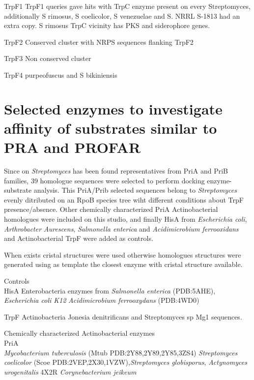 \documentclass[12pt,twoside]{reedthesis}
\begin{document}
  TrpF1 TrpF1 queries gave hits with TrpC enzyme present on every
  Streptomyces, additionally S rimosus, S coelicolor, S venezuelae and S.
  NRRL S-1813 had an extra copy. S rimosus TrpC vicinity has PKS and
  siderophore genes.
  
  TrpF2 Conserved cluster with NRPS sequences flanking TrpF2
  
  TrpF3 Non conserved cluster
  
  TrpF4 purpeofuscus and S bikiniensis \clearpage  
  
  \section{Selected enzymes to investigate affinity of substrates similar
  to PRA and
  PROFAR}\label{selected-enzymes-to-investigate-affinity-of-substrates-similar-to-pra-and-profar}
  
  Since on \emph{Streptomyces} has been found representatives from PriA
  and PriB families, 39 homologue sequences were selected to perform
  docking enzyme-substrate analysis. This PriA/Prib selected sequences
  belong to \emph{Streptomyces} evenly ditributed on an RpoB species tree
  wiht different conditions about TrpF presence/absence. Other chemically
  characterized PriA Actinobacterial homologues were included on this
  studio, and finally HisA from \emph{Escherichia coli},
  \emph{Arthrobacter Aurescens}, \emph{Salmonella enterica} and
  \emph{Acidimicrobium ferrooxidans} and Actinobacterial TrpF were added
  as controls.
  
  When exists cristal structures were used otherwise homologues structures
  were generated using as template the closest enzyme with cristal
  structure available.
  
  Controls\\
  HisA Enterobacteria enzymes from \emph{Salmonella enterica} (PDB:5AHE),
  \emph{Escherichia coli K12} \emph{Acidimicrobium ferrooxydans}
  (PDB:4WD0)
  
  TrpF Actinobacteria Jonesia denitrificans and Streptomyces sp Mg1
  sequences.
  
  Chemically characterized Actinobacterial enzymes\\
  PriA\\
  \emph{Mycobacterium tuberculosis} (Mtub PDB:2Y88,2Y89,2Y85,3ZS4)
  \emph{Streptomyces coelicolor} (Scoe
  PDB:2VEP,2X30,1VZW),\emph{Streptomyces globisporus}, \emph{Actynomyces
  urogenitalis} 4X2R \emph{Corynebacterium jeikeum}
  
\end{document}
